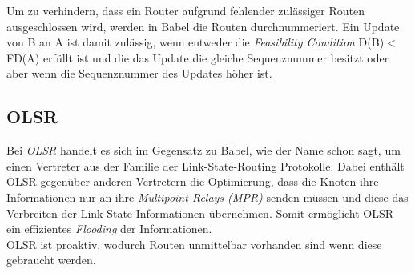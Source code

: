 \documentclass[10pt]{scrartcl}
\begin{document}
Um zu verhindern, dass ein Router aufgrund fehlender zulässiger Routen ausgeschlossen wird, werden in Babel die Routen durchnummeriert. Ein Update von B an A ist damit zulässig, wenn entweder die \textit{Feasibility Condition} D(B)$<$FD(A) erfüllt ist und die das Update die gleiche Sequenznummer besitzt oder aber wenn die Sequenznummer des Updates höher ist.


\subsection{OLSR}
Bei \textit{OLSR} handelt es sich im Gegensatz zu Babel, wie der Name schon sagt, um einen Vertreter aus der Familie der Link-State-Routing Protokolle.
Dabei enthält OLSR gegenüber anderen Vertretern die Optimierung, dass die Knoten ihre Informationen nur an ihre \textit{Multipoint Relays (MPR)} senden müssen und diese das Verbreiten der Link-State Informationen übernehmen.
Somit ermöglicht OLSR ein effizientes \textit{Flooding} der Informationen.\\
OLSR ist proaktiv, wodurch Routen unmittelbar vorhanden sind wenn diese gebraucht werden.
\end{document}
